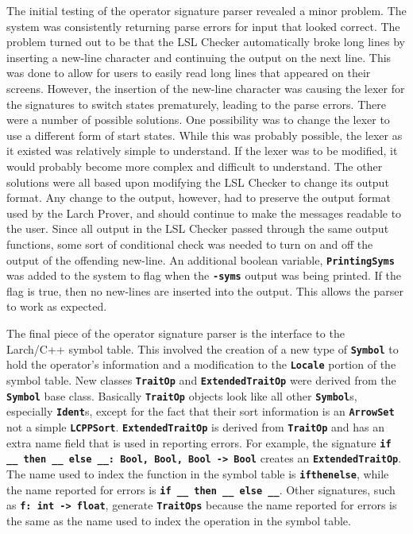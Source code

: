 \documentclass[12pt]{article} %
\newcommand{\reserved}[1]{\textbf{\texttt{#1}}} %
\begin{document}
The initial testing of the operator signature parser revealed a minor
problem. The system was consistently returning parse errors for input
that looked correct. The problem turned out to be that the LSL Checker
automatically broke long lines by inserting a
new-line character and continuing the output on the next line. This
was done to allow for users to easily read long lines that appeared on
their screens. However, the insertion of the new-line character was
causing the lexer for the signatures to switch states prematurely,
leading to the parse errors. There were a number of possible
solutions. One possibility was to change the lexer to use a different
form of start states. While this was probably possible, the lexer as
it existed was relatively simple to understand. If the lexer was to be
modified, it would probably become more complex and difficult to
understand. The other solutions were all based upon modifying the LSL
Checker to change its output format. Any change to the output,
however, had to preserve the output format used by the Larch Prover,
and should continue to make the messages readable to the user. Since
all output in the LSL Checker passed through the same output
functions, some sort of conditional check was needed to turn on and
off the output of the offending new-line. An additional boolean
variable, \reserved{PrintingSyms} was added to the system to flag when
the \reserved{-syms} output was being printed. If the flag is true,
then no new-lines are inserted into the output. This allows the parser
to work as expected.

The final piece of the operator signature parser is the interface to
the Larch/C++ symbol table. This involved the creation of a new type
of \reserved{Symbol} to hold the operator's information and a
modification to the \reserved{Locale} portion of the symbol
table. New classes \reserved{TraitOp} and
\reserved{ExtendedTraitOp} were derived from the \reserved{Symbol}
base class. Basically \reserved{TraitOp} objects look
like all other \reserved{Symbol}s, especially \reserved{Ident}s, except for the
fact that their sort information is an 
\reserved{ArrowSet} not a simple \reserved{LCPPSort}. \reserved{ExtendedTraitOp}
is derived from \reserved{TraitOp} and has an extra name field that is
used in reporting errors. For example, the signature \reserved{if \_\_
then \_\_ else \_\_: Bool, Bool, Bool -> Bool} creates an
\reserved{ExtendedTraitOp}. The name used to index the function in the
symbol table is \reserved{ifthenelse}, while the name reported for
errors is \reserved{if \_\_ then \_\_ else \_\_}. Other signatures, such as
\reserved{f: int -> float}, generate \reserved{TraitOps} because the
name reported for errors is the same as the name used to index the
operation in the symbol table. 
\end{document}
